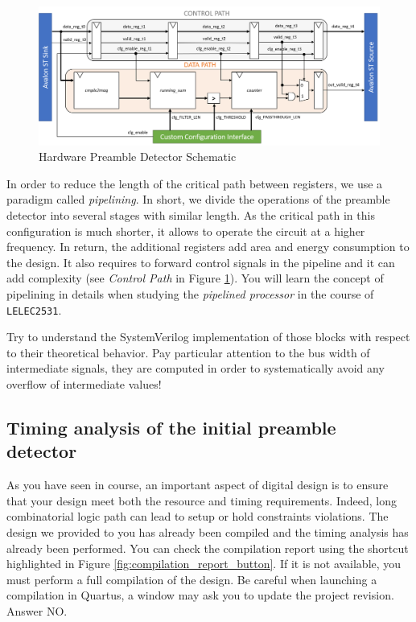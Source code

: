 \begin{figure}[!h]
    \centering
    \includegraphics[width=\linewidth]{figures/preamble_detect_block.png}
    \caption{Hardware Preamble Detector Schematic}
    \label{fig:pd_schematic}
\end{figure}

In order to reduce the length of the critical path between registers, we use a paradigm called \textit{pipelining}. In short, we divide the operations of the preamble detector into several stages with similar length. As the critical path in this configuration is much shorter, it allows to operate the circuit at a higher frequency. In return, the additional registers add area and energy consumption to the design. It also requires to forward control signals in the pipeline and it can add complexity (see \textit{Control Path} in Figure \ref{fig:pd_schematic}). You will learn the concept of pipelining in details when studying the \textit{pipelined processor} in the course of \texttt{LELEC2531}.

Try to understand the SystemVerilog implementation of those blocks with respect to their theoretical behavior. Pay particular attention to the bus width of intermediate signals, they are computed in order to systematically avoid any overflow of intermediate values!


\subsection{Timing analysis of the initial preamble detector}

As you have seen in course, an important aspect of digital design is to ensure that your design meet both the resource and timing requirements. Indeed, long combinatorial logic path can lead to setup or hold constraints violations. The design we provided to you has already been compiled and the timing analysis has already been performed. You can check the compilation report using the shortcut highlighted in Figure \ref{fig:compilation_report_button}. If it is not available, you must perform a full compilation of the design. Be careful when launching a compilation in Quartus, a window may ask you to update the project revision. Answer NO. 

